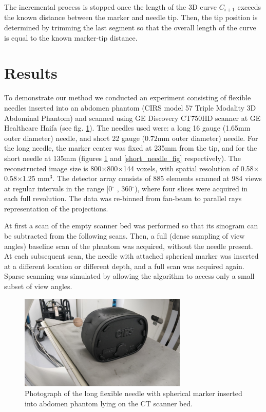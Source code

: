 \documentclass[letterpaper, 11 pt, conference]{ieeeconf} %
\begin{document}
The incremental process is stopped once the length of the 3D curve $C_{i+1}$ exceeds the known distance between the marker and needle tip. Then, the tip position is determined by trimming the last segment so that the overall length of the curve is equal to the known marker-tip distance.



\section{Results}

To demonstrate our method we conducted an experiment consisting of flexible needles inserted into an abdomen phantom (CIRS model 57 Triple Modality 3D Abdominal Phantom) and scanned using GE Discovery CT750HD scanner at GE Healthcare Haifa (see fig. \ref{long_needle_fig}). The needles used were: a long 16 gauge (1.65mm outer diameter) needle, and short 22 gauge (0.72mm outer diameter) needle. For the long needle, the marker center was fixed at 235mm from the tip, and for the short needle at 135mm (figures \ref{long_needle_fig} and \ref{short_needle_fig} respectively).
The reconstructed image size is 800$\times$800$\times$144 voxels, with spatial resolution of 0.58$\times$0.58$\times$1.25 mm$^3$. The detector array consists of 885 elements scanned at 984 views at regular intervals in the range [0$^{\circ}$ , 360$^{\circ}$), where four slices were acquired in each full revolution. The data was re-binned from fan-beam to parallel rays representation of the projections.

At first a scan of the empty scanner bed was performed so that its sinogram can be subtracted from the following scans. Then, a full (dense sampling of view angles) baseline scan of the phantom was acquired, without the needle present. At each subsequent scan, the needle with attached spherical marker was inserted at a different location or different depth, and a full scan was acquired again. Sparse scanning was simulated by allowing the algorithm to access only a small subset of view angles.


\begin{figure}[b]
\centering
\includegraphics[width=8cm]{long_needle_phantom.jpg}
\caption{\small{Photograph of the long flexible needle with spherical marker inserted into abdomen phantom lying on the CT scanner bed.}}
\label{long_needle_fig}
\end{figure}
\end{document}
